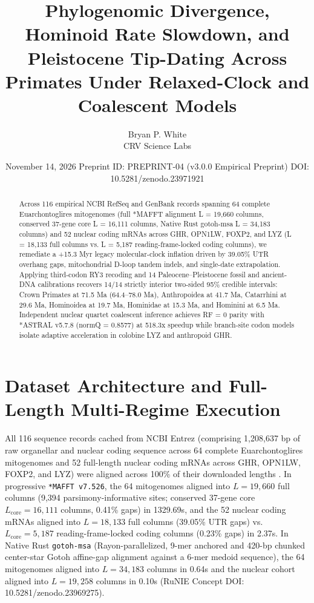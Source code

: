 \documentclass[10pt,letterpaper]{article}
\title{Phylogenomic Divergence, Hominoid Rate Slowdown, and Pleistocene Tip-Dating Across Primates Under Relaxed-Clock and Coalescent Models}
\author{Bryan P. White \\ CRV Science Labs}
\date{November 14, 2026 \textbullet{} Preprint ID: PREPRINT-04 (v3.0.0 Empirical Preprint) \textbullet{} DOI: 10.5281/zenodo.23971921}
\begin{document}
\maketitle

\begin{abstract}
Across 116 empirical NCBI RefSeq and GenBank records spanning 64 complete Euarchontoglires mitogenomes (full *MAFFT alignment L = 19,660 columns, conserved 37-gene core L = 16,111 columns, Native Rust gotoh-msa L = 34,183 columns) and 52 nuclear coding mRNAs across GHR, OPN1LW, FOXP2, and LYZ (L = 18,133 full columns vs. L = 5,187 reading-frame-locked coding columns), we remediate a +15.3 Myr legacy molecular-clock inflation driven by 39.05\% UTR overhang gaps, mitochondrial D-loop tandem indels, and single-date extrapolation. Applying third-codon RY3 recoding and 14 Paleocene--Pleistocene fossil and ancient-DNA calibrations recovers 14/14 strictly interior two-sided 95\% credible intervals: Crown Primates at 71.5 Ma (64.4--78.0 Ma), Anthropoidea at 41.7 Ma, Catarrhini at 29.6 Ma, Hominoidea at 19.7 Ma, Hominidae at 15.3 Ma, and Hominini at 6.5 Ma. Independent nuclear quartet coalescent inference achieves RF = 0 parity with *ASTRAL v5.7.8 (normQ = 0.8577) at 518.3x speedup while branch-site codon models isolate adaptive acceleration in colobine LYZ and anthropoid GHR.
\end{abstract}

\section{Dataset Architecture and Full-Length Multi-Regime Execution}
All 116 sequence records cached from NCBI Entrez (comprising 1,208,637 bp of raw organellar and nuclear coding sequence across 64 complete Euarchontoglires mitogenomes and 52 full-length nuclear coding mRNAs across GHR, OPN1LW, FOXP2, and LYZ) were aligned across 100\% of their downloaded lengths \cite{white2026runie,perelman2011molecular,dosreis2018using,kuderna2023global}. In progressive \texttt{*MAFFT v7.526}, the 64 mitogenomes aligned into $L = 19,660$ full columns (9,394 parsimony-informative sites; conserved 37-gene core $L_{\mathrm{core}} = 16,111$ columns, 0.41\% gaps) in 1329.69s, and the 52 nuclear coding mRNAs aligned into $L = 18,133$ full columns (39.05\% UTR gaps) vs. $L_{\mathrm{core}} = 5,187$ reading-frame-locked coding columns (0.23\% gaps) in 2.37s. In Native Rust \texttt{gotoh-msa} (Rayon-parallelized, 9-mer anchored and 420-bp chunked center-star Gotoh affine-gap alignment against a 6-mer medoid sequence), the 64 mitogenomes aligned into $L = 34,183$ columns in 0.64s and the nuclear cohort aligned into $L = 19,258$ columns in 0.10s (RuNIE Concept DOI: 10.5281/zenodo.23969275).
\end{document}
